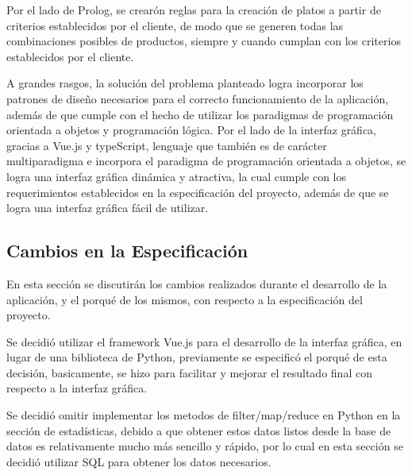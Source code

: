 Por el lado de Prolog, se crearón reglas para la creación de platos 
a partir de criterios establecidos por el cliente, de modo que 
se generen todas las combinaciones posibles de productos, siempre y
cuando cumplan con los criterios establecidos por el cliente.

A grandes rasgos, la solución del problema planteado logra 
incorporar los patrones de diseño necesarios para el correcto 
funcionamiento de la aplicación, además de que cumple con el hecho 
de utilizar los paradigmas de programación orientada a objetos y 
programación lógica. Por el lado de la interfaz gráfica, gracias a 
Vue.js y typeScript, lenguaje que también es de carácter multiparadigma 
e incorpora el paradigma de programación orientada a objetos,
se logra una interfaz gráfica dinámica y atractiva, la cual cumple con los
requerimientos establecidos en la especificación del proyecto, además de que se
logra una interfaz gráfica fácil de utilizar.

\subsection{Cambios en la Especificación}

En esta sección se discutirán los cambios realizados durante el desarrollo
de la aplicación, y el porqué de los mismos, con respecto a la especificación
del proyecto.

Se decidió utilizar el framework Vue.js para el desarrollo de la 
interfaz gráfica, en lugar de una biblioteca de Python, previamente 
se especificó el porqué de esta decisión, basicamente, se hizo para facilitar 
y mejorar el resultado final con respecto a la interfaz gráfica.

Se decidió omitir implementar los metodos de filter/map/reduce 
en Python en la sección de estadísticas, debido a que obtener estos datos 
listos desde la base de datos es relativamente mucho más sencillo y 
rápido, por lo cual en esta sección se decidió utilizar SQL para obtener
los datos necesarios.

